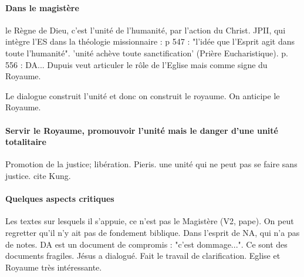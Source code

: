 \paragraph{Dans le magistère} le Règne de Dieu, c'est l'unité de l'humanité, par l'action du Christ. JPII, qui intègre l'ES dans la théologie missionnaire : p 547 : "l'idée que l'Esprit agit dans toute l'humanité". 'unité achève toute sanctification' (Prière Eucharistique).
p. 556 : DA... Dupuis veut articuler le rôle de l'Eglise mais comme signe du Royaume. 

Le dialogue construit l'unité et donc on construit le royaume. On anticipe le Royaume.

\paragraph{Servir le Royaume, promouvoir l'unité mais le danger d'une unité totalitaire} Promotion de la justice; libération. Pieris. une unité qui ne peut pas se faire sans justice. cite Kung. 

\paragraph{Quelques aspects critiques} Les textes sur lesquels il s'appuie, ce n'est pas le Magistère (V2, pape). On peut regretter qu'il n'y ait pas de fondement biblique. Dans l'esprit de NA, qui n'a pas de notes. DA est un document de compromis : "c'est dommage...". Ce sont des documents fragiles. Jésus a dialogué. 
Fait le travail de clarification. Eglise et Royaume très intéressante. 

